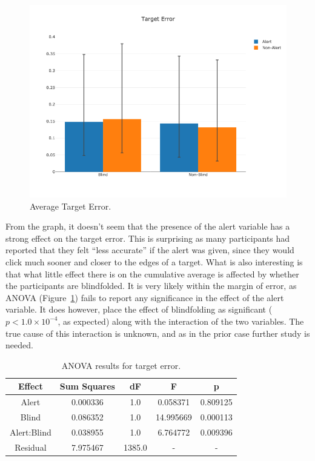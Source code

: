 \documentclass[
12pt, %
oneside, %
english, %
doublespacing, %
headsepline, %
]{MastersDoctoralThesis} %
\begin{document}
\begin{figure}[h]
	\centering\includegraphics[width=1\linewidth]{images/distancetotarget}
	\decoRule
	\caption[Phase 2 Target Error]{Average Target Error.}
	\label{fig:p2error}
\end{figure}

From the graph, it doesn't seem that the presence of the alert variable has a strong effect on the target error. This is surprising as many participants had reported that they felt ``less accurate'' if the alert was given, since they would click much sooner and closer to the edges of a target. What is also interesting is that what little effect there is on the cumulative average is affected by whether the participants are blindfolded. It is very likely within the margin of error, as ANOVA (Figure~\ref{tab:p2erroranova}) fails to report any significance in the effect of the alert variable. It does however, place the effect of blindfolding as significant ($p < 1.0 \times 10^{-4}$, as expected) along with the interaction of the two variables. The true cause of this interaction is unknown, and as in the prior case further study is needed.

\begin{table}
	\centering
	\begin{tabular}{c|cccc}
		\toprule
		Effect & Sum Squares & dF & F & p\\
		\midrule
		Alert & 0.000336 & 1.0 & 0.058371 & 0.809125\\
		Blind & 0.086352 & 1.0 & 14.995669 & 0.000113\\
		Alert:Blind & 0.038955 & 1.0 & 6.764772 & 0.009396\\
		Residual & 7.975467 & 1385.0 & - & -\\
		\bottomrule
	\end{tabular}
	\caption[Phase 1 Target Error ANOVA]{ANOVA results for target error.}
	\label{tab:p2erroranova}
\end{table}
\end{document}
